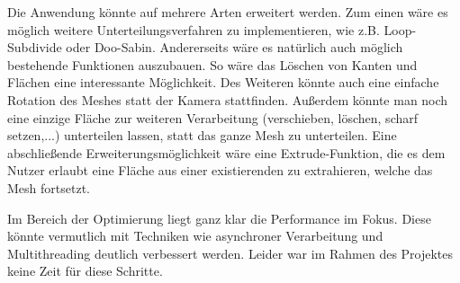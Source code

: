 Die Anwendung könnte auf mehrere Arten erweitert werden.
Zum einen wäre es möglich weitere Unterteilungsverfahren zu implementieren, wie z.B. Loop-Subdivide oder Doo-Sabin.
Andererseits wäre es natürlich auch möglich bestehende Funktionen auszubauen. 
So wäre das Löschen von Kanten und Flächen eine interessante Möglichkeit.
Des Weiteren könnte auch eine einfache Rotation des Meshes statt der Kamera stattfinden.
Außerdem könnte man noch eine einzige Fläche zur weiteren Verarbeitung (verschieben, löschen, scharf setzen,...) unterteilen lassen, statt das ganze Mesh zu unterteilen.
Eine abschließende Erweiterungsmöglichkeit wäre eine Extrude-Funktion, die es dem Nutzer erlaubt eine Fläche aus einer existierenden zu extrahieren, welche das Mesh fortsetzt.

Im Bereich der Optimierung liegt ganz klar die Performance im Fokus. 
Diese könnte vermutlich mit Techniken wie asynchroner Verarbeitung und Multithreading deutlich verbessert werden.
Leider war im Rahmen des Projektes keine Zeit für diese Schritte.
